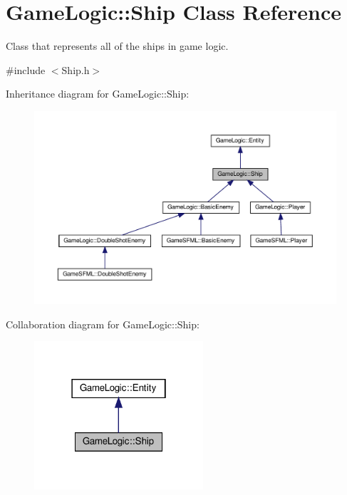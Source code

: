 \hypertarget{classGameLogic_1_1Ship}{}\section{Game\+Logic\+:\+:Ship Class Reference}
\label{classGameLogic_1_1Ship}


Class that represents all of the ships in game logic.  




{\ttfamily \#include $<$Ship.\+h$>$}



Inheritance diagram for Game\+Logic\+:\+:Ship\+:
\nopagebreak
\begin{figure}[H]
\begin{center}
\leavevmode
\includegraphics[width=350pt]{classGameLogic_1_1Ship__inherit__graph}
\end{center}
\end{figure}


Collaboration diagram for Game\+Logic\+:\+:Ship\+:\nopagebreak
\begin{figure}[H]
\begin{center}
\leavevmode
\includegraphics[width=178pt]{classGameLogic_1_1Ship__coll__graph}
\end{center}
\end{figure}
